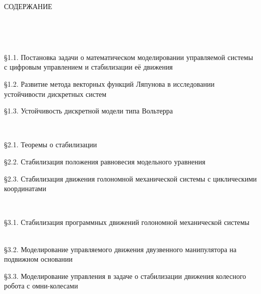 \documentclass[14pt,a4paper,final,russian]{report}
\renewcommand{\baselinestretch}{1}
\numberwithin{theorem}{chapter}
\numberwithin{lemma}{chapter}
\numberwithin{consectary}{chapter}
\numberwithin{pointout}{chapter}
\numberwithin{definition}{chapter}
\numberwithin{assertion}{chapter}
\begin{document}
	
	
\fontsize{14pt}{18pt}\selectfont
{}

\newpage
\renewcommand{\baselinestretch}{1.5}
\fontsize{14pt}{18pt}\selectfont


{\centerline{ {\sc СОДЕРЖАНИЕ }}
\vspace{5mm plus 1mm minus .5mm}}

 \dotfill\mbox{\ \ \pageref{prefix}}
\vglue 0.3cm

 \dotfill\mbox{\ \ \pageref{p11}}


\par \vglue 0.3cm 
\S 1.1. Постановка задачи о математическом моделировании управляемой системы с цифровым управлением и стабилизации её движения \dotfill\mbox{\ \ \pageref{p11}}
\par 
\S 1.2. Развитие метода векторных функций Ляпунова в исследовании устойчивости дискретных систем \dotfill\mbox{\ \ \pageref{p12}}

\S 1.3. Устойчивость дискретной модели типа Вольтерра \dotfill\mbox{\ \ \pageref{p13}}


\par \vglue 0.3cm
 \dotfill\mbox{\ \ \pageref{p21}}


\par \vglue 0.3cm
\S 2.1. Теоремы о стабилизации \dotfill\mbox{\ \ \pageref{p21}}

\S 2.2. Стабилизация положения равновесия модельного уравнения \dotfill\mbox{\ \ \pageref{p22}}

\S 2.3. Стабилизация движения голономной механической системы с циклическими координатами  \dotfill\mbox{\ \ \pageref{p23}}


\par \vglue 0.3cm
 \dotfill\mbox{\ \ \pageref{p31}}


\par \vglue 0.3cm
\S 3.1. Стабилизация программных движений голономной механической системы \dotfill\mbox{\ \ \pageref{p31}}


\S 3.2. Моделирование управляемого движения  двузвенного манипулятора на подвижном основании \dotfill\mbox{\ \ \pageref{p32}}


\S 3.3. Моделирование управления в задаче о стабилизации движения колесного робота с омни-колесами  \dotfill\mbox{\ \ \pageref{p33}}
\end{document}
